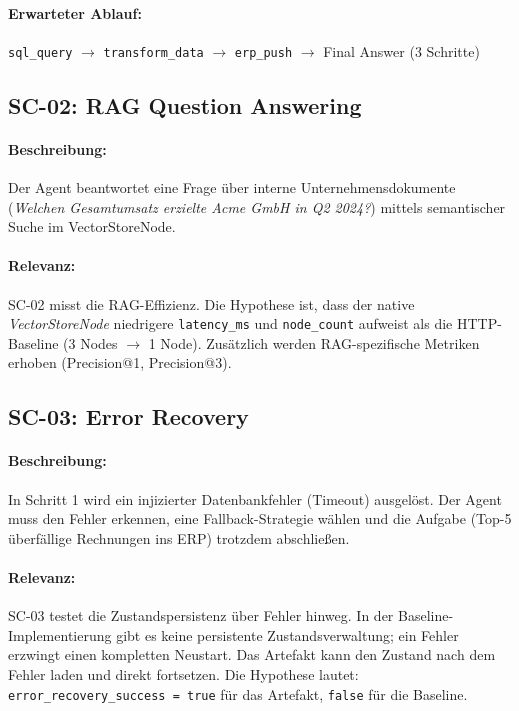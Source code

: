 \documentclass[12pt,a4paper,oneside]{report}
\begin{document}
\paragraph{Erwarteter Ablauf:}
\texttt{sql\_query} $\to$ \texttt{transform\_data} $\to$ \texttt{erp\_push} $\to$ Final Answer
(3 Schritte)

\subsection{SC-02: RAG Question Answering}

\paragraph{Beschreibung:}
Der Agent beantwortet eine Frage über interne Unternehmensdokumente (\textit{Welchen
Gesamtumsatz erzielte Acme GmbH in Q2 2024?}) mittels semantischer Suche im
VectorStoreNode.

\paragraph{Relevanz:}
SC-02 misst die RAG-Effizienz. Die Hypothese ist, dass der native \textit{VectorStoreNode}
niedrigere \texttt{latency\_ms} und \texttt{node\_count} aufweist als die
HTTP-Baseline (3 Nodes $\to$ 1 Node). Zusätzlich werden RAG-spezifische Metriken
erhoben (Precision@1, Precision@3).

\subsection{SC-03: Error Recovery}

\paragraph{Beschreibung:}
In Schritt 1 wird ein injizierter Datenbankfehler (Timeout) ausgelöst. Der Agent
muss den Fehler erkennen, eine Fallback-Strategie wählen und die Aufgabe (Top-5
überfällige Rechnungen ins ERP) trotzdem abschließen.

\paragraph{Relevanz:}
SC-03 testet die Zustandspersistenz über Fehler hinweg. In der Baseline-Implementierung
gibt es keine persistente Zustandsverwaltung; ein Fehler erzwingt einen kompletten
Neustart. Das Artefakt kann den Zustand nach dem Fehler laden und direkt fortsetzen.
Die Hypothese lautet: \texttt{error\_recovery\_success = true} für das Artefakt,
\texttt{false} für die Baseline.
\end{document}
